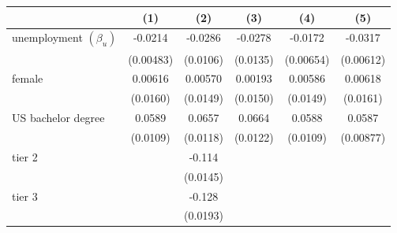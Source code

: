 \begin{table}[htbp]\centering
	\label{tb:table2}
\begin{adjustbox}{max width=0.68\textwidth}
\begin{tabular}{l*{5}{c}}
\hline\hline
                    &\multicolumn{1}{c}{(1)}&\multicolumn{1}{c}{(2)}&\multicolumn{1}{c}{(3)}&\multicolumn{1}{c}{(4)}&\multicolumn{1}{c}{(5)}\\
\hline
unemployment $\left( \beta_u \right)$        &     -0.0214\sym{***}&     -0.0286\sym{**} &     -0.0278\sym{*}  &     -0.0172\sym{**} &     -0.0317\sym{***}\\
                    &   (0.00483)         &    (0.0106)         &    (0.0135)         &   (0.00654)         &   (0.00612)         \\
[1em]
female        &     0.00616         &     0.00570         &     0.00193         &     0.00586         &     0.00618         \\
                    &    (0.0160)         &    (0.0149)         &    (0.0150)         &    (0.0149)         &    (0.0161)         \\
[1em]
US bachelor degree &      0.0589\sym{***}&      0.0657\sym{***}&      0.0664\sym{***}&      0.0588\sym{***}&      0.0587\sym{***}\\
                    &    (0.0109)         &    (0.0118)         &    (0.0122)         &    (0.0109)         &   (0.00877)         \\
[1em]
tier 2              &                     &      -0.114\sym{***}&                     &                     &                     \\
                    &                     &    (0.0145)         &                     &                     &                     \\
[1em]
tier 3              &                     &      -0.128\sym{***}&                     &                     &                     \\
                    &                     &    (0.0193)         &                     &                     &                     \\

\end{tabular}
\end{adjustbox}
\end{table}

